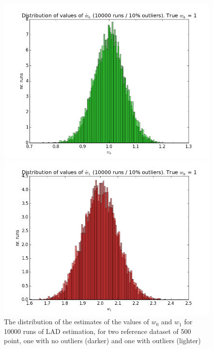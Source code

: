 \begin{figure}[h]
\centering
\begin{minipage}{.5\textwidth}
  \centering
  \includegraphics[width=1.0\linewidth]{chapter_lad/lad_w0_with_and_without_outliers.png}
\end{minipage}%
\begin{minipage}{.5\textwidth}
  \centering
  \includegraphics[width=1.0\linewidth]{chapter_lad/lad_w1_with_and_without_outliers.png}
\end{minipage}
  \label{fig.lad_estimates_with_and_with_no_outliers}
  \caption{The distribution of the estimates of the values of $w_0$ and $w_1$ for 10000 runs of LAD estimation, for two reference dataset of 500 point, one with no outliers (darker) and one with outliers (lighter)}
\end{figure}

